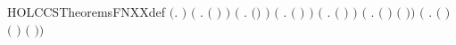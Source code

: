 \begin{SaveVerbatim}{HOLCCSTheoremsFNXXdef}
\HOLTokenTurnstile{} \ensuremath{(}\HOLSymConst{\HOLTokenForall{}}.    \HOLSymConst{\ensuremath{=}} \HOLTokenLeftbrace{}\HOLTokenRightbrace{}\ensuremath{)} \HOLSymConst{\HOLTokenConj{}}
   \ensuremath{(}\HOLSymConst{\HOLTokenForall{}}  .  \ensuremath{(} \HOLSymConst{\ensuremath{\ldotp}}\ensuremath{)}  \HOLSymConst{\ensuremath{=}}     \ensuremath{)} \HOLSymConst{\HOLTokenConj{}}
   \ensuremath{(}\HOLSymConst{\HOLTokenForall{}} .  \ensuremath{(}\HOLConst{\ensuremath{\tau}}\HOLSymConst{\ensuremath{\ldotp}}\ensuremath{)}  \HOLSymConst{\ensuremath{=}}   \ensuremath{)} \HOLSymConst{\HOLTokenConj{}}
   \ensuremath{(}\HOLSymConst{\HOLTokenForall{}}  .  \ensuremath{(} \HOLSymConst{\ensuremath{+}} \ensuremath{)}  \HOLSymConst{\ensuremath{=}}    \HOLConst{\HOLTokenUnion{}}   \ensuremath{)} \HOLSymConst{\HOLTokenConj{}}
   \ensuremath{(}\HOLSymConst{\HOLTokenForall{}}  .  \ensuremath{(} \HOLSymConst{\ensuremath{\mid}} \ensuremath{)}  \HOLSymConst{\ensuremath{=}}    \HOLConst{\HOLTokenUnion{}}   \ensuremath{)} \HOLSymConst{\HOLTokenConj{}}
   \ensuremath{(}\HOLSymConst{\HOLTokenForall{}}  .  \ensuremath{(}  \ensuremath{)}  \HOLSymConst{\ensuremath{=}}     \ensuremath{(} \HOLConst{\HOLTokenUnion{}}   \ensuremath{)}\ensuremath{)} \HOLSymConst{\HOLTokenConj{}}
   \ensuremath{(}\HOLSymConst{\HOLTokenForall{}}  .
       \ensuremath{(}  \ensuremath{)}  \HOLSymConst{\ensuremath{=}}  \ensuremath{(} \ensuremath{)} \ensuremath{(}  \ensuremath{)}\ensuremath{)} \HOLSymConst{\HOLTokenConj{}}

\end{SaveVerbatim}
